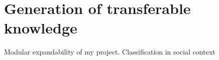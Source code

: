 \chapter{Generation of transferable knowledge}\label{ch:knowledge}

Modular expandability of my project.
Classification in social context



%
